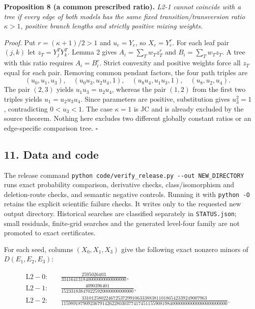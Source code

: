 \documentclass[
  11pt,
]{article}
\begin{document}
\textbf{Proposition 8 (a common prescribed ratio).} \emph{L2-1 cannot
coincide with a tree if every edge of both models has the same fixed
transition/transversion ratio \(\kappa>1\), positive branch lengths and
strictly positive mixing weights.}

\emph{Proof.} Put \(r=(\kappa+1)/2>1\) and \(u_e=Y_e\), so
\(X_e=Y_e^r\). For each leaf pair \((j,k)\) let \(z_T=Y_j^TY_k^T\).
Lemma 2 gives \(A_i=\sum_Tw_Tz_T^r\) and \(B_i=\sum_Tw_Tz_T\). A tree
with this ratio requires \(A_i=B_i^r\). Strict convexity and positive
weights force all \(z_T\) equal for each pair. Removing common pendant
factors, the four path triples are \[
(u_0,u_1,u_3),\quad(u_0u_3,u_2u_4,1),\quad
(u_8u_4,u_1u_3,1),\quad(u_8,u_2,u_4).
\] The pair \((2,3)\) yields \(u_1u_3=u_2u_4\), whereas the pair
\((1,2)\) from the first two triples yields \(u_1=u_2u_3u_4\). Since
parameters are positive, substitution gives \(u_3^2=1\), contradicting
\(0<u_3<1\). The case \(\kappa=1\) is JC and is already excluded by the
source theorem. Nothing here excludes two different globally constant
ratios or an edge-specific comparison tree. \(\square\)

\subsection{11. Data and code}\label{data-and-code}

The release command
\texttt{python\ code/verify\_release.py\ -\/-out\ NEW\_DIRECTORY} runs
exact probability comparison, derivative checks, class/isomorphism and
deletion-route checks, and semantic negative controls. Running it with
\texttt{python\ -O} retains the explicit scientific failure checks. It
writes only to the requested new output directory. Historical searches
are classified separately in \texttt{STATUS.json}; small residuals,
finite-grid searches and the generated level-four family are not
promoted to exact certificates.

For each seed, columns \((X_0,X_1,X_3)\) give the following exact
nonzero minors of \(D(E_1,E_2,E_3)\):

\[
\begin{aligned}
\mathrm{L2\!\!-0}:&\quad \frac{2595026403}{334164131840000000000000000},\\
\mathrm{L2\!\!-1}:&\quad \frac{4090396401}{152331838470225920000000000000},\\
\mathrm{L2\!\!-2}:&\quad \frac{3310125802246725372991063338838110186542339249007963}{115989187909236791426228030377417451155908198400000000000000000000000}.
\end{aligned}
\]
\end{document}

